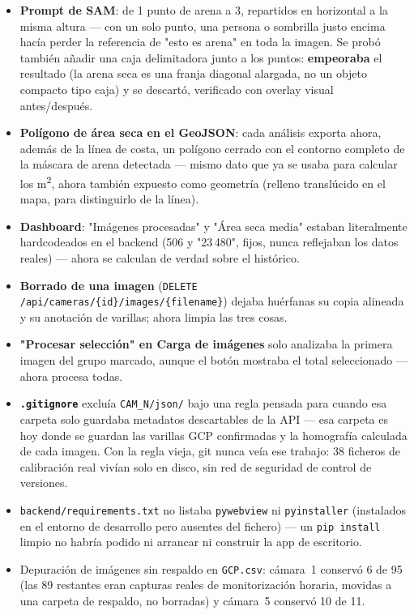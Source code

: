 \begin{itemize}[leftmargin=1.5em]
  \item \textbf{Prompt de SAM}: de 1 punto de arena a 3, repartidos en horizontal a la misma
        altura — con un solo punto, una persona o sombrilla justo encima hacía perder la
        referencia de "esto es arena" en toda la imagen. Se probó también añadir una caja
        delimitadora junto a los puntos: \textbf{empeoraba} el resultado (la arena seca es una
        franja diagonal alargada, no un objeto compacto tipo caja) y se descartó, verificado con
        overlay visual antes/después.
  \item \textbf{Polígono de área seca en el GeoJSON}: cada análisis exporta ahora, además de la
        línea de costa, un polígono cerrado con el contorno completo de la máscara de arena
        detectada — mismo dato que ya se usaba para calcular los m\textsuperscript{2}, ahora
        también expuesto como geometría (relleno translúcido en el mapa, para distinguirlo de la
        línea).
  \item \textbf{Dashboard}: "Imágenes procesadas" y "Área seca media" estaban literalmente
        hardcodeados en el backend (506 y "23\,480", fijos, nunca reflejaban los datos reales) —
        ahora se calculan de verdad sobre el histórico.
  \item \textbf{Borrado de una imagen} (\texttt{DELETE /api/cameras/\{id\}/images/\{filename\}})
        dejaba huérfanas su copia alineada y su anotación de varillas; ahora limpia las tres
        cosas.
  \item \textbf{"Procesar selección" en Carga de imágenes} solo analizaba la primera imagen del
        grupo marcado, aunque el botón mostraba el total seleccionado — ahora procesa todas.
  \item \textbf{\texttt{.gitignore}} excluía \texttt{CAM\_N/json/} bajo una regla pensada para
        cuando esa carpeta solo guardaba metadatos descartables de la API — esa carpeta es hoy
        donde se guardan las varillas GCP confirmadas y la homografía calculada de cada imagen.
        Con la regla vieja, git nunca veía ese trabajo: 38 ficheros de calibración real vivían
        solo en disco, sin red de seguridad de control de versiones.
  \item \texttt{backend/requirements.txt} no listaba \texttt{pywebview} ni \texttt{pyinstaller}
        (instalados en el entorno de desarrollo pero ausentes del fichero) — un
        \texttt{pip install} limpio no habría podido ni arrancar ni construir la app de
        escritorio.
  \item Depuración de imágenes sin respaldo en \texttt{GCP.csv}: cámara~1 conservó 6 de 95
        (las 89 restantes eran capturas reales de monitorización horaria, movidas a una carpeta
        de respaldo, no borradas) y cámara~5 conservó 10 de 11.
\end{itemize}

